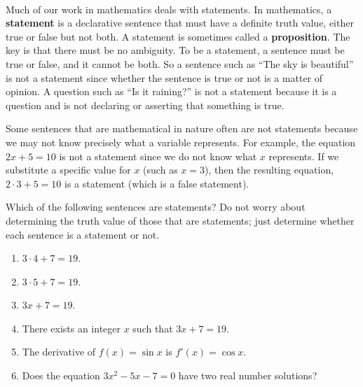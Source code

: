 %
 \begin{previewactivity} \hfill \label{PA:prop}\\
Much of our work in mathematics deals with statements.  In mathematics, a \textbf{statement}
\label{D:prop}%
%
  is a declarative sentence that must have a definite truth value, either true or false but not both.    
A statement is sometimes called a \textbf{proposition}.
%
The key is that there must be no ambiguity.  To be a statement, a sentence must be  true or false, and it cannot be both.  So a sentence such as ``The sky is beautiful'' is not a statement since whether the sentence is true or not is a matter of opinion.  A question such as ``Is it raining?'' is not a statement because it is a question and is not declaring or asserting that something is true.

Some sentences that are mathematical in nature often are not statements because we may not know precisely what a variable represents.  For example, the equation $2x + 5 = 10$ is not a statement since we do not know what $x$ represents.  If we substitute a specific value for $x$ (such as $x = 3$), then the resulting equation, $2 \cdot 3 + 5 = 10$ is a statement (which is a false statement). 


\noindent
Which of the following sentences are statements?  Do not worry about determining the truth value of those that are statements; just determine whether each sentence is a statement or not.
\begin{multicols}{2}
\begin{enumerate}
\item $3 \cdot 4 + 7 = 19$.
\item $3 \cdot 5 + 7 = 19$.
\item $3x + 7 = 19$.
\end{enumerate}
\end{multicols}
\begin{enumerate} \setcounter{enumi}{3}
  \item There exists an integer $x$ such that $3x + 7 = 19$.
\item The derivative of $f(x) = \sin x$ is $f'(x) = \cos x$.
\item Does the equation $3x^2 - 5x - 7 = 0$ have two real number solutions?
\end{enumerate}


\end{previewactivity}
